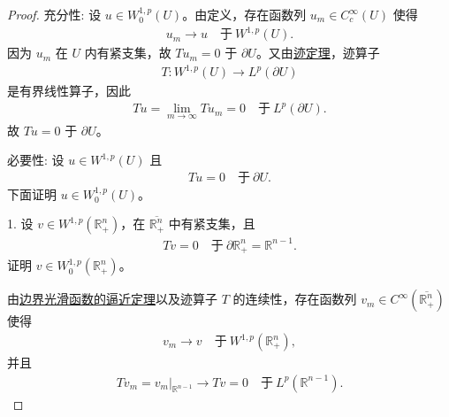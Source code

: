 \documentclass[../../main.tex]{subfiles}
\begin{document}
\begin{proof}

{\heiti 充分性:} 设 $u\in W^{1,p}_{0}(U)$。由定义，存在函数列 $u_{m}\in C^{\infty}_{c}(U)$ 使得
\begin{align*}
u_{m}\to u\quad\text{于}\ W^{1,p}(U).
\end{align*}
因为 $u_{m}$ 在 $U$ 内有紧支集，故 $Tu_{m}=0$ 于 $\partial U$。又由\hyperref[theorem:ch05-迹定理]{迹定理}，迹算子
\begin{align*}
T:W^{1,p}(U)\to L^{p}(\partial U)
\end{align*}
是有界线性算子，因此
\begin{align*}
Tu=\lim_{m\to\infty}Tu_{m}=0\quad\text{于}\ L^{p}(\partial U).
\end{align*}
故 $Tu=0$ 于 $\partial U$。

{\heiti 必要性:} 设 $u\in W^{1,p}(U)$ 且
\begin{align}\label{eq:ch05-零迹-假设}
Tu=0\quad\text{于}\ \partial U.
\end{align}
下面证明 $u\in W^{1,p}_{0}(U)$。

1.
设 $v\in W^{1,p}(\mathbb{R}^{n}_{+})$，在 $\overline{\mathbb{R}^{n}_{+}}$ 中有紧支集，且
\begin{align}\label{eq:ch05-零迹-半空间假设}
Tv=0\quad\text{于}\ \partial\mathbb{R}^{n}_{+}=\mathbb{R}^{n-1}.
\end{align}
证明 $v\in W^{1,p}_{0}(\mathbb{R}^{n}_{+})$。

由\hyperref[theorem:ch05-直到边界光滑的函数整体逼近定理]{边界光滑函数的逼近定理}以及迹算子 $T$ 的连续性，存在函数列 $v_{m}\in C^{\infty}(\overline{\mathbb{R}^{n}_{+}})$ 使得
\begin{align}\label{eq:ch05-零迹-半空间逼近}
v_{m}\to v\quad\text{于}\ W^{1,p}(\mathbb{R}^{n}_{+}),
\end{align}
并且
\begin{align}\label{eq:ch05-零迹-半空间迹逼近}
Tv_{m}=v_{m}|_{\mathbb{R}^{n-1}}\to Tv=0\quad\text{于}\ L^{p}(\mathbb{R}^{n-1}).
\end{align}


\end{proof}
\end{document}
